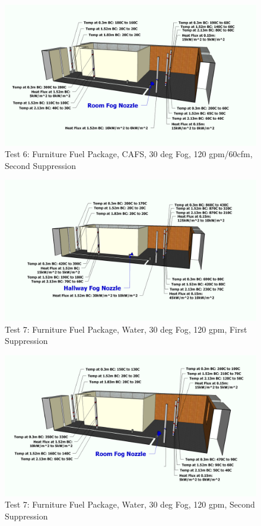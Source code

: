 \documentclass[12pt,oneside]{book}
\begin{document}
\begin{figure}[!ht]
	\includegraphics[width=6in]{../Figures/Pictures/Metric/DelCoFogTest6SecondSuppression}
	\caption{Test 6: Furniture Fuel Package, CAFS, 30 deg Fog, 120 gpm/60cfm, Second Suppression}
	\label{fig:Test_6_Second_Suppression}
\end{figure}

\begin{figure}[!ht]
	\includegraphics[width=6in]{../Figures/Pictures/Metric/DelCoFogTest7FirstSuppression}
	\caption{Test 7: Furniture Fuel Package, Water, 30 deg Fog, 120 gpm, First Suppression}
	\label{fig:Test_7_First_Suppression}
\end{figure}

\begin{figure}[!ht]
	\includegraphics[width=6in]{../Figures/Pictures/Metric/DelCoFogTest7SecondSuppression}
	\caption{Test 7: Furniture Fuel Package, Water, 30 deg Fog, 120 gpm, Second Suppression}
	\label{fig:Test_7_Second_Suppression}
\end{figure}
\end{document}
